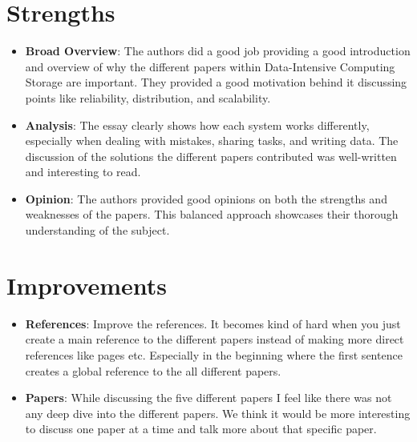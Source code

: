 \documentclass[12pt]{article}
\begin{document}
\section{Strengths}
\begin{itemize}
    \item \textbf{Broad Overview}: The authors did a good job providing a good introduction and overview of why the different papers within Data-Intensive Computing Storage are important. They provided a good motivation behind it discussing points like reliability, distribution, and scalability.
    \item \textbf{Analysis}: The essay clearly shows how each system works differently, especially when dealing with mistakes, sharing tasks, and writing data. The discussion of the solutions the different papers contributed was well-written and interesting to read.
    \item \textbf{Opinion}: The authors provided good opinions on both the strengths and weaknesses of the papers. This balanced approach showcases their thorough understanding of the subject.
\end{itemize}

\section{Improvements}
\begin{itemize}
    \item \textbf{References}: Improve the references. It becomes kind of hard when you just create a main reference to the different papers instead of making more direct references like pages etc. Especially in the beginning where the first sentence creates a global reference to the all different papers.
\end{itemize}
\begin{itemize}
    \item \textbf{Papers}: While discussing the five different papers I feel like there was not any deep dive into the different papers. We think it would be more interesting to discuss one paper at a time and talk more about that specific paper.
\end{itemize}


\end{document}
